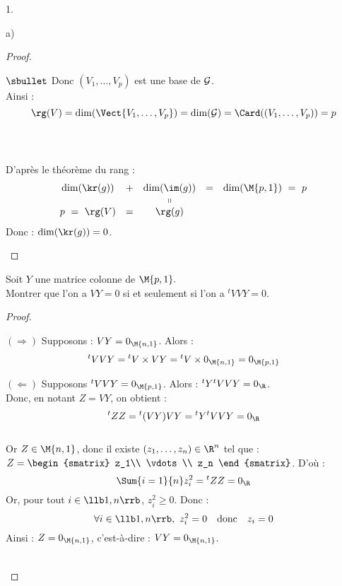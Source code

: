 \documentclass[11pt]{article}%
\begin{document}
\begin{noliste}{1.}
\begin{noliste}{a)}
\begin{proof}
\begin{noliste}{$\sbullet$}
    Donc $(V_1, \ldots, V_p)$ est une base de ${\cal G}$.\\
    Ainsi : ~\\[-.6cm]
    \[
     \rg(V) = \dim(\Vect{V_1, \ldots , V_p}) = \dim({\cal G})
     = \Card((V_1, \ldots, V_p))= p
    \]
    ~\\[-1cm]
    
    ~\\[-1.2cm]

    
    \item D'après le théorème du rang :
    \[
     \begin{array}{ccccc}
      \dim(\kr(g)) & + & \dim(\im(g)) & = & \dim(\M{p,1}) \ = \ p
      \\
       & & \shortparallel 
      \\
      p \ = \ \rg(V) & = & \rg(g)
     \end{array}
    \]
    Donc : $\dim(\kr(g)) = 0$.
    ~\\[-1.6cm]
   \end{noliste}
  \end{proof}
  
  \item Soit $Y$ une matrice colonne de $\M{p,1}.$\\
  Montrer que l'on a $VY=0$ si et seulement si l'on a ${}^t{}VVY=0$.
  
  \begin{proof}~
   \begin{liste}{\quad}
    \item[$(\Rightarrow)$]
    Supposons : $VY=0_{\M{n,1}}$. Alors :
    \[
     {}^t{}VVY = {}^t{}V \times VY = {}^t{} V \times 0_{\M{n,1}}
     = 0_{\M{p,1}}
    \]
    
    \item[$(\Leftarrow)$]
    Supposons ${}^t{}VVY=0_{\M{p,1}}$. Alors : ${}^t{} Y {}^t{} V
    VY=0_{\R}$. \\[.1cm]
    Donc, en notant $Z=VY$, on obtient :
    \[
     {}^t{}ZZ= {}^t{}(VY)VY = {}^t{}Y {}^t{} VVY=0_{\R}
    \]~\\[-.4cm]
    Or $Z\in \M{n,1}$, donc il existe $(z_1, \ldots, z_n) \in \R^n$
    tel que : $Z=
    \begin{smatrix}
     z_1\\
     \vdots \\
     z_n
    \end{smatrix}$. D'où :~\\[-.4cm]
    \[
     \Sum{i=1}{n} z_i^2 = {}^t{}ZZ=0_{\R}
    \]
    Or, pour tout $i \in \llb 1, n\rrb$, $z_i^2 \geq 0$. Donc :
    \[
     \forall i \in \llb 1,n \rrb, \ z_i^2 =0 \quad \mbox{donc} 
     \quad z_i=0
    \]
    Ainsi : $Z=0_{\M{n,1}}$, c'est-à-dire : $VY=0_{\M{n,1}}$.
   \end{liste}
   ~\\[-1cm]
  \end{proof}
  

\end{noliste}
\end{noliste}
\end{document}
